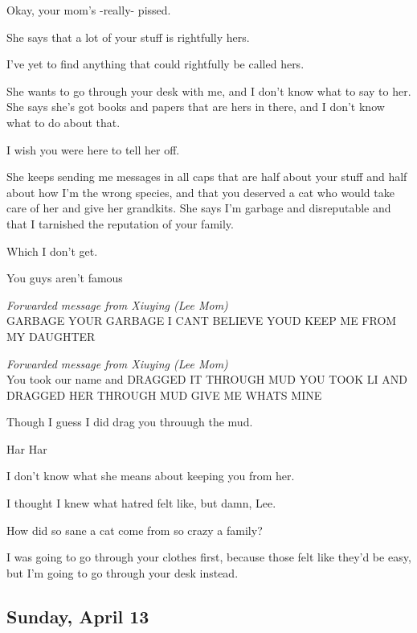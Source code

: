 {
Okay, your mom's -really- pissed.

She says that a lot of your stuff is
rightfully hers.

I've yet to find anything that could
rightfully be called hers.

She wants to go through your desk
with me, and I don't know what to say to her. She says she's got books
and papers that are hers in there, and I don't know what to do about
that.

I wish you were here to tell her
off.

She keeps sending me messages in all
caps that are half about your stuff and half about how I'm the wrong
species, and that you deserved a cat who would take care of her and give
her grandkits. She says I'm garbage and disreputable and that I
tarnished the reputation of your family.

Which I don't get.

You guys aren't famous

\emph{Forwarded message from Xiuying
(Lee Mom)}\\
GARBAGE YOUR GARBAGE I CANT BELIEVE YOUD KEEP ME FROM MY
DAUGHTER

\emph{Forwarded message from Xiuying
(Lee Mom)}\\
You took our name and DRAGGED IT THROUGH MUD YOU TOOK LI AND
DRAGGED HER THROUGH MUD GIVE ME WHATS MINE

Though I guess I did drag you
throuugh the mud.

Har Har

I don't know what she means about
keeping you from her.

I thought I knew what hatred felt
like, but damn, Lee.

How did so sane a cat come from so
crazy a family?

I was going to go through your
clothes first, because those felt like they'd be easy, but I'm going to
go through your desk instead.

\newpage

\subsection*{Sunday, April 13}\label{sunday-april-13}

}
